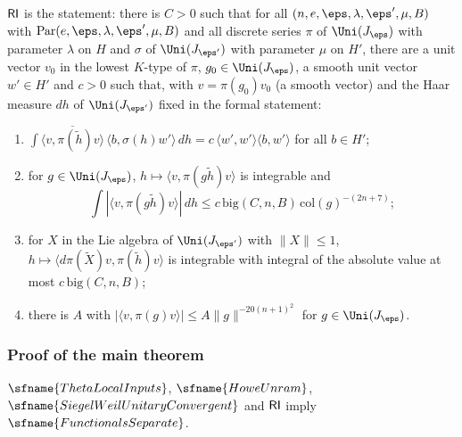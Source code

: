 \begin{definition}\label{pf:fs:RI}
$\mathsf{RI}$ is the statement: there is $C>0$ such that for all $(n,e,\eps,\lambda,\eps',\mu,B)$ with
$\mathrm{Par}(e,\eps,\lambda,\eps',\mu,B)$ and all discrete series $\pi$ of $\Uni(J_\eps)$ with parameter $\lambda$ on $H$ and
$\sigma$ of $\Uni(J_{\eps'})$ with parameter $\mu$ on $H'$, there are a unit vector $v_0$ in the lowest $K$-type of $\pi$,
$g_0\in\Uni(J_\eps)$, a smooth unit vector $w'\in H'$ and $c>0$ such that, with $v=\pi(g_0)v_0$ (a smooth vector) and the Haar
measure $dh$ of $\Uni(J_{\eps'})$ fixed in the formal statement:
\begin{enumerate}[label=(\roman*)]
\item $\int\overline{\langle v,\pi(\tilde h)v\rangle}\,\langle b,\sigma(h)w'\rangle\,dh=c\,\langle w',w'\rangle\langle b,w'\rangle$ for
all $b\in H'$;
\item for $g\in\Uni(J_\eps)$, $h\mapsto\langle v,\pi(g\tilde h)v\rangle$ is integrable and
\[
\int|\langle v,\pi(g\tilde h)v\rangle|\,dh\le c\,\mathrm{big}(C,n,B)\,\mathrm{col}(g)^{-(2n+7)};
\]
\item for $X$ in the Lie algebra of $\Uni(J_{\eps'})$ with $\|X\|\le1$, $h\mapsto\langle d\pi(\tilde X)v,\pi(\tilde h)v\rangle$ is
integrable with integral of the absolute value at most $c\,\mathrm{big}(C,n,B)$;
\item there is $A$ with $|\langle v,\pi(g)v\rangle|\le A\|g\|^{-20(n+1)^2}$ for $g\in\Uni(J_\eps)$.
\end{enumerate}
\end{definition}

\subsubsection{Proof of the main theorem}

\begin{theorem}\label{pf:fs:mainRI}
$\sfname{ThetaLocalInputs}$, $\sfname{HoweUnram}$, $\sfname{SiegelWeilUnitaryConvergent}$ and $\mathsf{RI}$ imply
$\sfname{FunctionalsSeparate}$.
\end{theorem}

